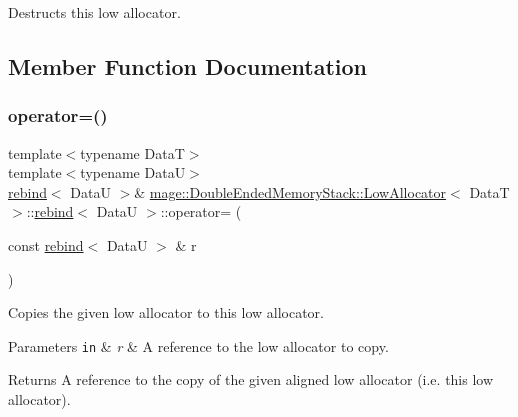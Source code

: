 Destructs this low allocator. 

\subsection{Member Function Documentation}
\hypertarget{structmage_1_1_double_ended_memory_stack_1_1_low_allocator_1_1rebind_ad9015378ce09c362a25fd0a7d1b3eda5}{}\label{structmage_1_1_double_ended_memory_stack_1_1_low_allocator_1_1rebind_ad9015378ce09c362a25fd0a7d1b3eda5} 
\subsubsection{\texorpdfstring{operator=()}{operator=()}\hspace{0.1cm}{\footnotesize\ttfamily [1/2]}}
{\footnotesize\ttfamily template$<$typename DataT$>$ \\
template$<$typename DataU$>$ \\
\hyperlink{structmage_1_1_double_ended_memory_stack_1_1_low_allocator_1_1rebind}{rebind}$<$ DataU $>$\& \hyperlink{structmage_1_1_double_ended_memory_stack_1_1_low_allocator}{mage\+::\+Double\+Ended\+Memory\+Stack\+::\+Low\+Allocator}$<$ DataT $>$\+::\hyperlink{structmage_1_1_double_ended_memory_stack_1_1_low_allocator_1_1rebind}{rebind}$<$ DataU $>$\+::operator= (\begin{DoxyParamCaption}\item[{const \hyperlink{structmage_1_1_double_ended_memory_stack_1_1_low_allocator_1_1rebind}{rebind}$<$ DataU $>$ \&}]{r }\end{DoxyParamCaption})\hspace{0.3cm}{\ttfamily [delete]}}

Copies the given low allocator to this low allocator.


\begin{DoxyParams}[1]{Parameters}
\mbox{\tt in}  & {\em r} & A reference to the low allocator to copy. \\
\hline
\end{DoxyParams}
\begin{DoxyReturn}{Returns}
A reference to the copy of the given aligned low allocator (i.\+e. this low allocator). 
\end{DoxyReturn}
\hypertarget{structmage_1_1_double_ended_memory_stack_1_1_low_allocator_1_1rebind_a9ccd16e84aa36e483d813ca7ffdc6898}{}\label{structmage_1_1_double_ended_memory_stack_1_1_low_allocator_1_1rebind_a9ccd16e84aa36e483d813ca7ffdc6898} 
